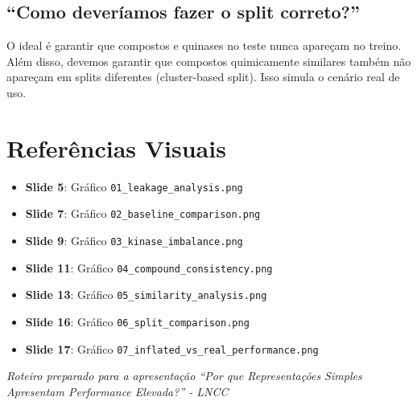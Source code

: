 \documentclass[11pt,a4paper]{article}
\begin{document}
\subsection{``Como deveríamos fazer o split correto?''}
O ideal é garantir que compostos e quinases no teste nunca apareçam no treino. Além disso, devemos garantir que compostos quimicamente similares também não apareçam em splits diferentes (cluster-based split). Isso simula o cenário real de uso.

\section{Referências Visuais}

\begin{itemize}
    \item \textbf{Slide 5}: Gráfico \texttt{01\_leakage\_analysis.png}
    \item \textbf{Slide 7}: Gráfico \texttt{02\_baseline\_comparison.png}
    \item \textbf{Slide 9}: Gráfico \texttt{03\_kinase\_imbalance.png}
    \item \textbf{Slide 11}: Gráfico \texttt{04\_compound\_consistency.png}
    \item \textbf{Slide 13}: Gráfico \texttt{05\_similarity\_analysis.png}
    \item \textbf{Slide 16}: Gráfico \texttt{06\_split\_comparison.png}
    \item \textbf{Slide 17}: Gráfico \texttt{07\_inflated\_vs\_real\_performance.png}
\end{itemize}

\vspace{1cm}
\begin{center}
\textit{Roteiro preparado para a apresentação ``Por que Representações Simples Apresentam Performance Elevada?'' - LNCC}
\end{center}
\end{document}
